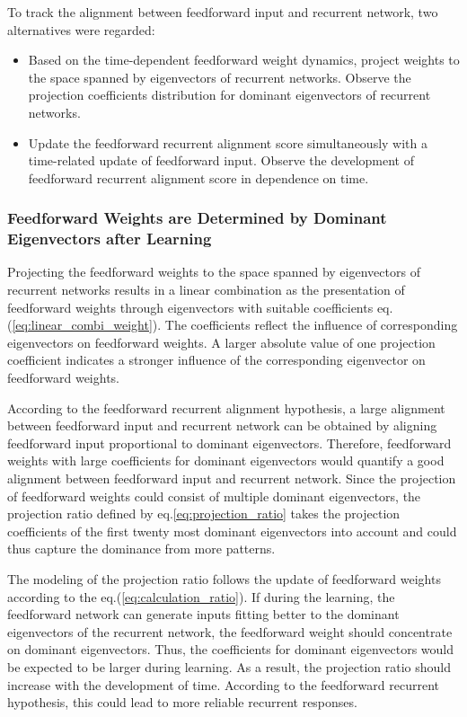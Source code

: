 \documentclass[11pt]{article}
\begin{document}
	To track the alignment between feedforward input and recurrent network, two alternatives were regarded:
		\begin{itemize}
			\item Based on the time-dependent feedforward weight dynamics, project weights to the space spanned by eigenvectors of recurrent networks. Observe the projection coefficients distribution for dominant eigenvectors of recurrent networks.
			\item Update the feedforward recurrent alignment score simultaneously with a time-related update of feedforward input. Observe the development of feedforward recurrent alignment score in dependence on time. 
		\end{itemize}

	\subsubsection{Feedforward Weights are Determined by Dominant Eigenvectors after Learning}
	
	Projecting the feedforward weights to the space spanned by eigenvectors of recurrent networks results in a linear combination as the presentation of feedforward weights through eigenvectors with suitable coefficients eq.(\ref{eq:linear_combi_weight}). The coefficients reflect the influence of corresponding eigenvectors on feedforward weights. A larger absolute value of one projection coefficient indicates a stronger influence of the corresponding eigenvector on feedforward weights. 
	
	According to the feedforward recurrent alignment hypothesis, a large alignment between feedforward input and recurrent network can be obtained by aligning feedforward input proportional to dominant eigenvectors. 
	Therefore, feedforward weights with large coefficients for dominant eigenvectors would quantify a good alignment between feedforward input and recurrent network. Since the projection of feedforward weights could consist of multiple dominant eigenvectors, the projection ratio defined by eq.\ref{eq:projection_ratio} takes the projection coefficients of the first twenty most dominant eigenvectors into account and could thus capture the dominance from more patterns. 
	
	The modeling of the projection ratio follows the update of feedforward weights according to the eq.(\ref{eq:calculation_ratio}). If during the learning, the feedforward network can generate inputs fitting better to the dominant eigenvectors of the recurrent network, the feedforward weight should concentrate on dominant eigenvectors. Thus, the coefficients for dominant eigenvectors would be expected to be larger during learning. As a result, the projection ratio should increase with the development of time. According to the feedforward recurrent hypothesis, this could lead to more reliable recurrent responses. 
	
\end{document}
